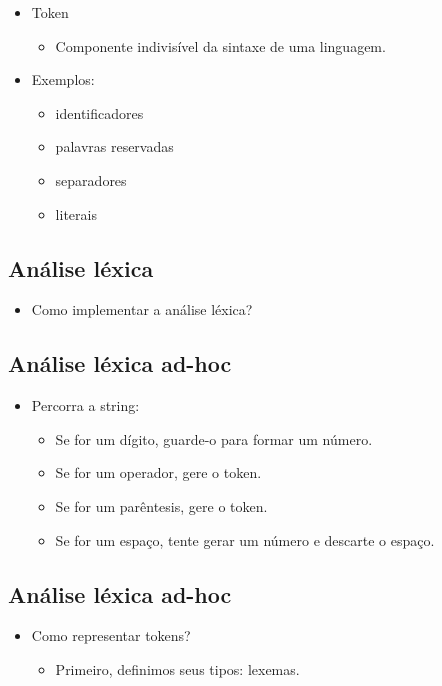 \documentclass[11pt]{article}
\begin{document}
\begin{itemize}
\item Token
\begin{itemize}
\item Componente indivisível da sintaxe de uma linguagem.
\end{itemize}
\item Exemplos:
\begin{itemize}
\item identificadores
\item palavras reservadas
\item separadores
\item literais
\end{itemize}
\end{itemize}
\subsection*{Análise léxica}
\label{sec:orga1ccf91}

\begin{itemize}
\item Como implementar a análise léxica?
\end{itemize}
\subsection*{Análise léxica ad-hoc}
\label{sec:orge42cf5c}

\begin{itemize}
\item Percorra a string:
\begin{itemize}
\item Se for um dígito, guarde-o para formar um número.
\item Se for um operador, gere o token.
\item Se for um parêntesis, gere o token.
\item Se for um espaço, tente gerar um número e descarte o espaço.
\end{itemize}
\end{itemize}
\subsection*{Análise léxica ad-hoc}
\label{sec:orgb625dec}

\begin{itemize}
\item Como representar tokens?
\begin{itemize}
\item Primeiro, definimos seus tipos: lexemas.
\end{itemize}
\end{itemize}
\end{document}
